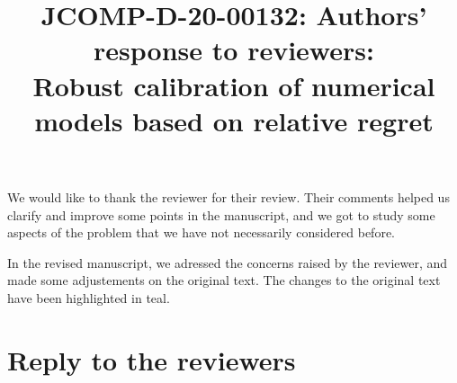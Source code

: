\documentclass[a4paper,11pt]{article}
\begin{document}
\title{JCOMP-D-20-00132: Authors' response to reviewers:\\
  Robust calibration of numerical models based on relative regret
}


\maketitle
We would like to thank the reviewer for their review. Their comments helped us clarify and improve some points in the manuscript, and we got to study some aspects of the problem that we have not necessarily considered before.

In the revised manuscript, we adressed the concerns raised by the reviewer, and made some adjustements on the original text. The changes to the original text have been highlighted in {\color{teal}teal}.
\section{Reply to the reviewers}
\end{document}
